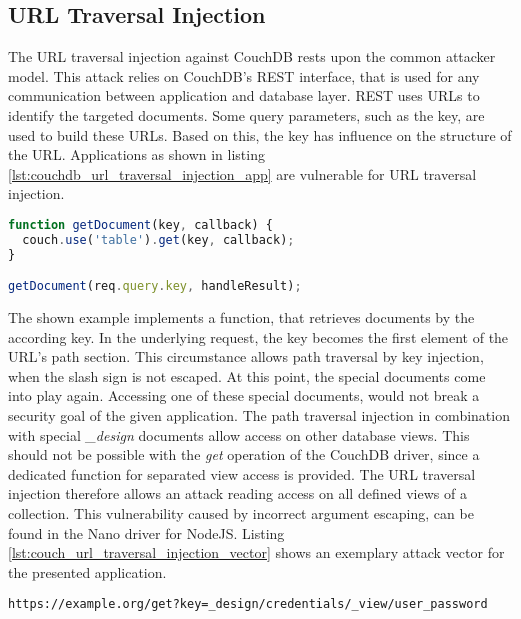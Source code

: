 \subsection{URL Traversal Injection}
The URL traversal injection against CouchDB rests upon the common attacker model. This attack relies on CouchDB's REST interface, that is used for any communication between application and database layer. REST uses URLs to identify the targeted documents. Some query parameters, such as the key, are used to build these URLs. Based on this, the key has influence on the structure of the URL. Applications as shown in listing \ref{lst:couchdb_url_traversal_injection_app} are vulnerable for URL traversal injection. \\

\begin{lstlisting}[caption={Vulnerable NodeJS example for URL traversal injection against CouchDB}, label={lst:couchdb_url_traversal_injection_app}, language=JavaScript]
function getDocument(key, callback) {
  couch.use('table').get(key, callback);
}

getDocument(req.query.key, handleResult);
\end{lstlisting}

The shown example implements a function, that retrieves documents by the according key. In the underlying request, the key becomes the first element of the URL's path section. This circumstance allows path traversal by key injection, when the slash sign is not escaped. At this point, the special documents come into play again. Accessing one of these special documents, would not break a security goal of the given application. The path traversal injection in combination with special \emph{\_design} documents allow access on other database views. This should not be possible with the \emph{get} operation of the CouchDB driver, since a dedicated function for separated view access is provided. The URL traversal injection therefore allows an attack reading access on all defined views of a collection. This vulnerability caused by incorrect argument escaping, can be found in the Nano driver for NodeJS. Listing \ref{lst:couch_url_traversal_injection_vector} shows an exemplary attack vector for the presented application. \\

\begin{lstlisting}[caption={Attack vector against CouchDB for URL traversal injection via the query-string parameter}, label={lst:couch_url_traversal_injection_vector}]
https://example.org/get?key=_design/credentials/_view/user_password
\end{lstlisting}

